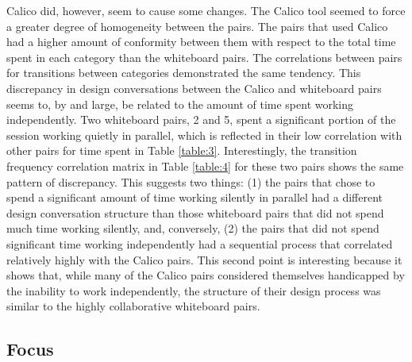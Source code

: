 Calico did, however, seem to cause some changes. The Calico tool seemed to force a greater degree of homogeneity between the pairs. The pairs that used Calico had a higher amount of conformity between them with respect to the total time spent in each category than the whiteboard pairs. The correlations between pairs for transitions between categories demonstrated the same tendency. This discrepancy in design conversations between the Calico and whiteboard pairs seems to, by and large, be related to the amount of time spent working independently. Two whiteboard pairs, 2 and 5, spent a significant portion of the session working quietly in parallel, which is reflected in their low correlation with other pairs for time spent in Table \ref{table:3}. Interestingly, the transition frequency correlation matrix in Table \ref{table:4} for these two pairs shows the same pattern of discrepancy. This suggests two things: (1) the pairs that chose to spend a significant amount of time working silently in parallel had a different design conversation structure than those whiteboard pairs that did not spend much time working silently, and, conversely, (2) the pairs that did not spend significant time working independently had a sequential process that correlated relatively highly with the Calico pairs. This second point is interesting because it shows that, while many of the Calico pairs considered themselves handicapped by the inability to work independently, the structure of their design process was similar to the highly collaborative whiteboard pairs. 

\subsection {Focus}
\label{discussion:4}

